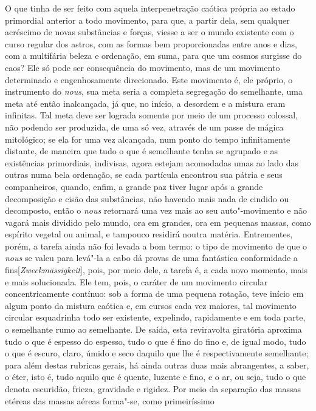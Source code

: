 O que tinha de ser feito com aquela interpenetração caótica própria ao estado
primordial anterior a todo movimento, para que, a partir dela, sem qualquer
acréscimo de novas substâncias e forças, viesse a ser o mundo existente com o
curso regular dos astros, com as formas bem proporcionadas entre anos e dias,
com a multifária beleza e ordenação, em suma, para que um cosmos surgisse do
caos? Ele só pode ser consequência do movimento, mas de um movimento
determinado e engenhosamente direcionado. Este movimento é, ele próprio, o
instrumento do \textit{nous}, sua meta seria a completa segregação do
semelhante, uma meta até então inalcançada, já que, no início, a desordem e a
mistura eram infinitas. Tal meta deve ser lograda somente por meio de um
processo colossal, não podendo ser produzida, de uma só vez, através de um
passe de mágica mitológico; se ela for uma vez alcançada, num ponto do tempo
infinitamente distante, de maneira que tudo o que é semelhante tenha se
agrupado e as existências primordiais, indivisas, agora estejam acomodadas
umas ao lado das outras numa bela ordenação, se cada partícula encontrou sua
pátria e seus companheiros, quando, enfim, a grande paz tiver lugar após a
grande decomposição e cisão das substâncias, não havendo mais nada de cindido
ou decomposto, então o \textit{nous} retornará uma vez mais ao seu
auto"-movimento e não vagará mais dividido pelo mundo, ora em grandes, ora em
pequenas massas, como espírito vegetal ou animal, e tampouco residirá noutra
matéria. Entrementes, porém, a tarefa ainda não foi levada a bom termo: o
tipo de movimento de que o \textit{nous} se valeu para levá"-la a cabo dá
provas de uma fantástica conformidade a fins[\textit{Zweckmässigkeit}], pois,
por meio dele, a tarefa é, a cada novo momento, mais e mais solucionada. Ele
tem, pois, o caráter de um movimento circular concentricamente contínuo: sob
a forma de uma pequena rotação, teve início em algum ponto da mistura caótica
e, em cursos cada vez maiores, tal movimento circular esquadrinha todo ser
existente, expelindo, rapidamente e em toda parte, o semelhante rumo ao
semelhante. De saída, esta reviravolta giratória aproxima tudo o que é
espesso do espesso, tudo o que é fino do fino e, de igual modo, tudo o que é
escuro, claro, úmido e seco daquilo que lhe é respectivamente semelhante;
para além destas rubricas gerais, há ainda outras duas mais abrangentes, a
saber, o éter, isto é, tudo aquilo que é quente, luzente e fino, e o ar, ou
seja, tudo o que denota escuridão, frieza, gravidade e rigidez. Por meio da
separação das massas etéreas das massas aéreas forma"-se, como primeiríssimo
